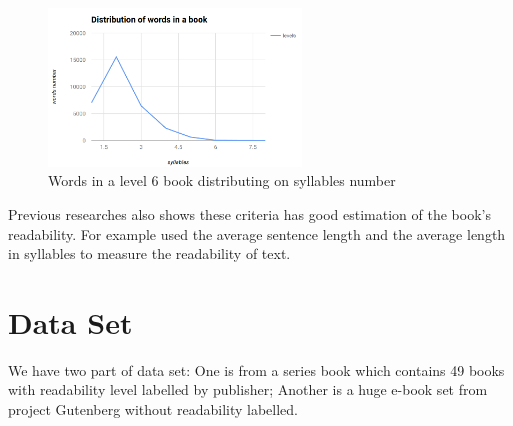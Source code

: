 \documentclass{article}
\begin{document}
\begin{figure}[H]
\begin{center}
\includegraphics[width=0.6\textwidth]{wordsDistribution} 
\caption{Words in a level 6 book distributing on syllables number}
\end{center}
\end{figure}

Previous researches also shows these criteria has good estimation of the book's readability. For example \cite{flesch}\cite{klare}\cite{chall} used the average sentence length and the average length in syllables to measure the readability of text. 

\section{Data Set}
We have two part of data set: One is from a series book which contains 49 books with readability level labelled by publisher; Another is a huge e-book set from project Gutenberg without readability labelled.
\end{document}
